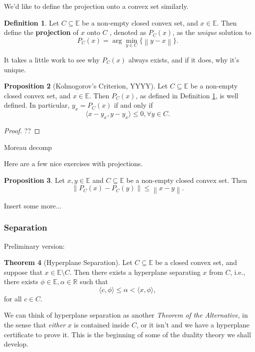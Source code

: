\documentclass[11pt]{article}
\numberwithin{equation}{section}
\theoremstyle{definition}
\newtheorem{theorem}{Theorem}[section]
\newtheorem{proposition}[theorem]{Proposition}
\newtheorem{definition}[theorem]{Definition}%
\newcommand{\bE}{\mathbb{E}}
\newcommand{\bR}{\mathbb{R}}
\newcommand{\norm}[1]{\left\lVert#1\right\rVert}
\begin{document}
We'd like to define the projection onto a convex set similarly.
\begin{definition}
    \label{defprojectioncvx}%
    Let $C\subseteq\bE$ be a non-empty closed convex set, and $x\in\bE$. Then define the \textbf{projection} of $x$ onto $C$ , denoted as $P_C(x)$, as the \textit{unique} solution to
    \begin{equation}
        P_C(x)=\arg\min_{y\in C}\{\norm{y-x}\}.
    \end{equation}
\end{definition}
It takes a little work to see why $P_C(x)$ always exists, and if it does, why it's unique. 
\begin{proposition}[Kolmogorov's Criterion, YYYY]
    Let $C\subseteq\bE$ be a non-empty closed convex set, and $x\in\bE$. Then $P_C(x)$, as defined in Definition \ref{defprojectioncvx}, is well defined. In particular, $y_x=P_C(x)$ if and only if
    \begin{equation}
        \langle x-y_x, y-y_x\rangle\le0, \forall y\in C.
    \end{equation}
\end{proposition}
\begin{proof}
??
\end{proof}

Moreau decomp

Here are a few nice exercises with projections.
\begin{proposition}
    Let $x,y\in\bE$ and $C\subseteq\bE$ be a non-empty closed convex set. Then
    \begin{equation}
        \norm{P_C(x)-P_C(y)} \le \norm{x-y}.
    \end{equation}
\end{proposition}
Insert some more...
\subsubsection{Separation}
Preliminary version:
\begin{theorem}[Hyperplane Separation]
    \label{thmhyperplanesep}%
    Let $C\subseteq\bE$ be a closed convex set, and suppose that $x\in\bE\setminus C$. Then there exists a hyperplane separating $x$ from $C$, i.e., there exists $\phi\in\bE,\alpha\in\bR$ such that
    \begin{equation}
        \langle c,\phi\rangle\le\alpha<\langle x,\phi\rangle,
    \end{equation}
    for all $c\in C$.
\end{theorem}
We can think of hyperplane separation as another \textit{Theorem of the Alternative}, in the sense that \textit{either} $x$ is contained inside $C$, or it isn't and we have a hyperplane certificate to prove it. This is the beginning of some of the duality theory we shall develop.
\end{document}

